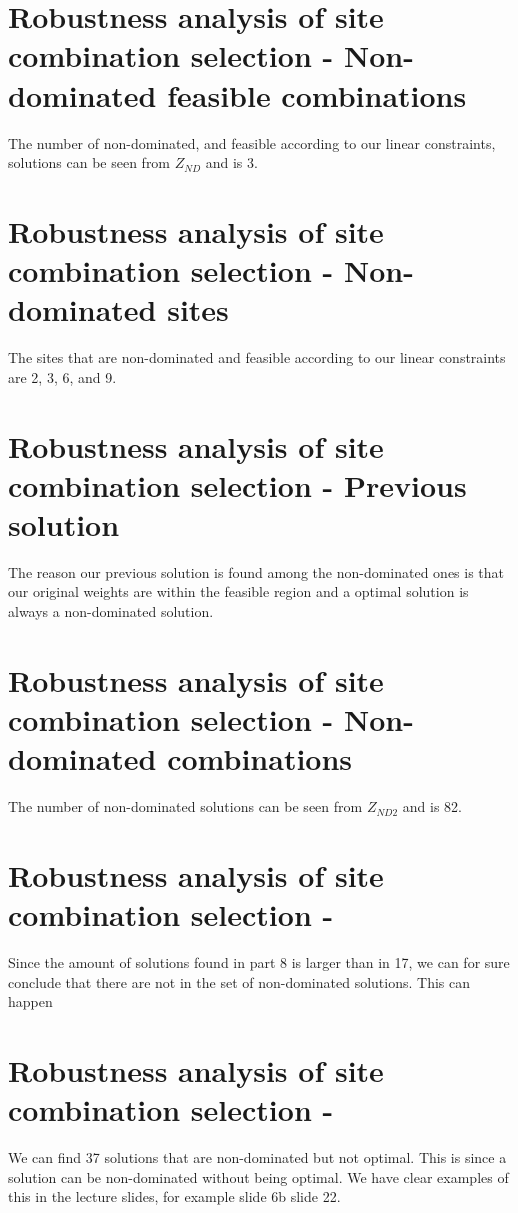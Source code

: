 \documentclass{article}
\begin{document}
\section{Robustness analysis of site combination selection - Non-dominated feasible combinations}
The number of non-dominated, and feasible according to our linear constraints, solutions can be seen from $Z_{ND}$ and is 3.
\section{Robustness analysis of site combination selection - Non-dominated sites}
The sites that are non-dominated and feasible according to our linear constraints are 2, 3, 6, and 9. 
\section{Robustness analysis of site combination selection - Previous solution}
The reason our previous solution is found among the non-dominated ones is that our original weights are within the feasible region and a optimal solution is always a non-dominated solution. 
\section{Robustness analysis of site combination selection - Non-dominated combinations}
The number of non-dominated solutions can be seen from $Z_{ND2}$ and is 82.
\section{Robustness analysis of site combination selection - }
Since the amount of solutions found in part 8 is larger than in 17, we can for sure conclude that there are not in the set of non-dominated solutions. This can happen 

\section{Robustness analysis of site combination selection - }
We can find 37 solutions that are non-dominated but not optimal. This is since a solution can be non-dominated without being optimal. We have clear examples of this in the lecture slides, for example slide 6b slide 22. 
\end{document}
